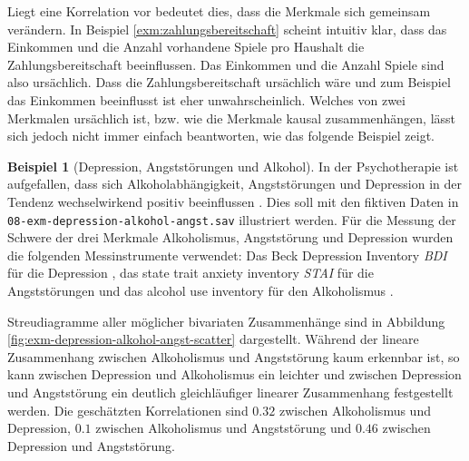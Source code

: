 \documentclass[
]{book}
\theoremstyle{definition}
\theoremstyle{definition}
\newtheorem{example}{Beispiel}[chapter]
\theoremstyle{definition}
\theoremstyle{definition}
\theoremstyle{remark}
\begin{document}
Liegt eine Korrelation vor bedeutet dies, dass die Merkmale sich gemeinsam verändern. In Beispiel \ref{exm:zahlungsbereitschaft} scheint intuitiv klar, dass das Einkommen und die Anzahl vorhandene Spiele pro Haushalt die Zahlungsbereitschaft beeinflussen. Das Einkommen und die Anzahl Spiele sind also ursächlich. Dass die Zahlungsbereitschaft ursächlich wäre und zum Beispiel das Einkommen beeinflusst ist eher unwahrscheinlich. Welches von zwei Merkmalen ursächlich ist, bzw. wie die Merkmale kausal zusammenhängen, lässt sich jedoch nicht immer einfach beantworten, wie das folgende Beispiel zeigt.

\begin{example}[Depression, Angststörungen und Alkohol]
\protect\hypertarget{exm:depression-alkohol-angst}{}\label{exm:depression-alkohol-angst}In der Psychotherapie ist aufgefallen, dass sich Alkoholabhängigkeit, Angststörungen und Depression in der Tendenz wechselwirkend positiv beeinflussen \citep{schuckit1996}. Dies soll mit den fiktiven Daten in \texttt{08-exm-depression-alkohol-angst.sav} illustriert werden. Für die Messung der Schwere der drei Merkmale Alkoholismus, Angststörung und Depression wurden die folgenden Messinstrumente verwendet: Das Beck Depression Inventory \emph{BDI} für die Depression \citep{beck1988}, das state trait anxiety inventory \emph{STAI} für die Angststörungen \citep{spielberger1983manual} und das alcohol use inventory für den Alkoholismus \citep{skinner1982}.
\end{example}

Streudiagramme aller möglicher bivariaten Zusammenhänge sind in Abbildung \ref{fig:exm-depression-alkohol-angst-scatter} dargestellt. Während der lineare Zusammenhang zwischen Alkoholismus und Angststörung kaum erkennbar ist, so kann zwischen Depression und Alkoholismus ein leichter und zwischen Depression und Angststörung ein deutlich gleichläufiger linearer Zusammenhang festgestellt werden. Die geschätzten Korrelationen sind \(0.32\) zwischen Alkoholismus und Depression, \(0.1\) zwischen Alkoholismus und Angststörung und \(0.46\) zwischen Depression und Angststörung.
\end{document}
